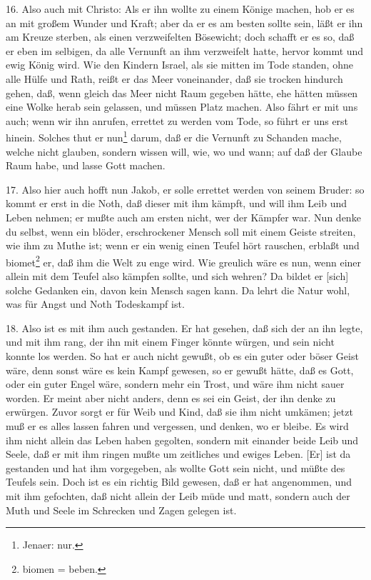 16. Also auch mit Christo: Als er ihn wollte zu einem Könige machen, hob er es an mit großem Wunder und Kraft; aber da er es am besten sollte sein, läßt er ihn am Kreuze sterben, als einen verzweifelten Bösewicht; doch schafft er es so, daß er eben im selbigen, da alle Vernunft an ihm verzweifelt hatte, hervor kommt und ewig König wird. Wie den Kindern Israel, als sie mitten im Tode standen, ohne alle Hülfe und Rath, reißt er das Meer voneinander, daß sie trocken hindurch gehen, daß, wenn gleich das Meer nicht Raum gegeben hätte, ehe hätten müssen eine Wolke herab sein gelassen, und müssen Platz machen. Also fährt er mit uns auch; wenn wir ihn anrufen, errettet zu werden vom Tode, so führt er uns erst hinein. Solches thut er nun\footnote{Jenaer: nur.}
darum, daß er die Vernunft zu Schanden mache, welche nicht glauben, sondern wissen will, wie, wo und wann; auf daß der Glaube Raum habe, und lasse Gott machen.

17. Also hier auch hofft nun Jakob, er solle errettet werden von seinem Bruder: so kommt er erst in die Noth, daß dieser mit ihm kämpft, und will ihm Leib und Leben nehmen; er mußte auch am ersten nicht, wer der Kämpfer war. Nun denke du selbst, wenn ein blöder, erschrockener Mensch soll mit einem Geiste streiten, wie ihm zu Muthe ist; wenn er ein wenig einen Teufel hört rauschen, erblaßt und biomet\footnote{biomen = beben.} er, daß ihm die Welt zu enge wird. Wie greulich wäre es nun, wenn einer allein mit dem Teufel also kämpfen sollte, und sich wehren? Da bildet er [sich] solche Gedanken ein, davon kein Mensch sagen kann. Da lehrt die Natur wohl, was für Angst und Noth Todeskampf ist.

18. Also ist es mit ihm auch gestanden. Er hat gesehen, daß sich der an ihn legte, und mit ihm rang, der ihn mit einem Finger könnte würgen, und sein nicht konnte los werden. So hat er auch nicht gewußt, ob es ein guter oder böser Geist wäre, denn sonst wäre es kein Kampf gewesen, so er gewußt hätte, daß es Gott, oder ein guter Engel wäre, sondern mehr ein Trost, und wäre ihm nicht sauer worden. Er meint aber nicht anders, denn es sei ein Geist, der ihn denke zu erwürgen. Zuvor sorgt er für Weib und Kind, daß sie ihm nicht umkämen; jetzt muß er es alles lassen fahren und vergessen, und denken, wo er bleibe. Es wird ihm nicht allein das Leben haben gegolten, sondern mit einander beide Leib und Seele, daß er mit ihm ringen mußte um zeitliches und ewiges Leben. [Er] ist da gestanden und hat ihm vorgegeben, als wollte Gott sein nicht, und müßte des Teufels sein. Doch ist es ein richtig Bild gewesen, daß er hat angenommen, und mit ihm gefochten, daß nicht allein der Leib müde und matt, sondern auch der Muth und Seele im Schrecken und Zagen gelegen ist.

